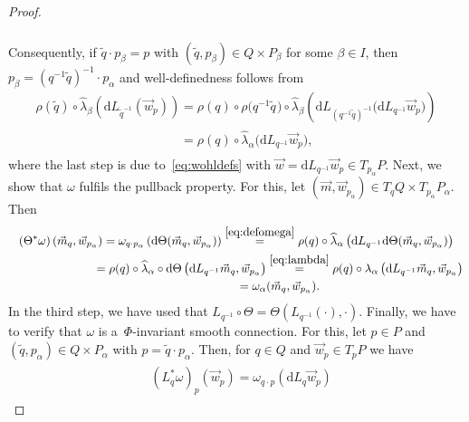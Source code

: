 \documentclass[11pt]{article}
\numberwithin{equation}{section}
\newcommand{\wt}[1]{\widetilde{#1}}
\begin{document}
\begin{proof}
\begin{gather}
\begin{split}
\end{split}
\label{eq:thirdstep}
\end{gather}
Consequently, if $\wt{q}\cdot p_\beta=p$ with $(\wt{q},p_\beta)\in Q\times P_\beta$ for some $\beta \in I$, then
$p_\beta=(q^{-1}\wt{q})^{-1}\cdot p_\alpha$ and well-def\/inedness follows from
\begin{gather*}
\rho(\wt{q})\circ \widehat{\lambda}_\beta\left(\mathrm{d}
L_{{\wt{q}}^{-1}}(\vec{w}_p)\right)=\rho(q)\circ\rho\big(q^{-1}\wt{q}\hspace{1pt}\big)\circ\widehat{\lambda}_\beta\left(\mathrm{d}
L_{(q^{-1}\wt{q})^{-1}}\big( \mathrm{d} L_{q^{-1}}\vec{w}_p\big)\right)
\\
\phantom{\rho(\wt{q})\circ \widehat{\lambda}_\beta\left(\mathrm{d}
L_{{\wt{q}}^{-1}}(\vec{w}_p)\right)}
{} =\rho(q)\circ \widehat{\lambda}_\alpha\big(\mathrm{d} L_{q^{-1}}\vec{w}_p\big),
\end{gather*}
where the last step is due to~\eqref{eq:wohldefs} with $\vec{w}=\mathrm{d} L_{q^{-1}}\vec{w}_p\in T_{p_\alpha}P$.
Next, we show that $\omega$ fulf\/ils the pullback property.
For this, let $(\vec{m},\vec{w}_{p_\alpha})\in T_qQ\times T_{p_\alpha}P_\alpha$.
Then
\begin{gather*}
(\Theta^{*}\omega)\left(\vec{m}_q,\vec{w}_{p_\alpha}\right)
=\omega_{q\cdot p_\alpha}\left(\mathrm{d}\Theta(\vec{m}_q,\vec{w}_{p_\alpha})\right) \stackrel{\eqref{eq:defomega}}{=}\rho(q)\circ
\widehat{\lambda}_\alpha\left(\mathrm{d} L_{q^{-1}}\mathrm{d}\Theta(\vec{m}_q,\vec{w}_{p_\alpha})\right)
\\
\phantom{(\Theta^{*}\omega)\left(\vec{m}_q,\vec{w}_{p_\alpha}\right)}
=\rho(q)\circ \widehat{\lambda}_\alpha\circ \mathrm{d}\Theta\left(\mathrm{d} L_{q^{-1}}
\vec{m}_q,\vec{w}_{p_\alpha}\right) \stackrel{\eqref{eq:lambda}}{=}\rho(q)\circ \lambda_\alpha\left(\mathrm{d}
L_{q^{-1}} \vec{m}_q,\vec{w}_{p_\alpha}\right)
\\
\phantom{(\Theta^{*}\omega)\left(\vec{m}_q,\vec{w}_{p_\alpha}\right)}
=\omega_\alpha(\vec{m}_q,\vec{w}_{p_\alpha}).
\end{gather*}
In the third step, we have used that $L_{q^{-1}}\circ \Theta= \Theta(L_{q^{-1}}(\cdot),\cdot)$.
Finally, we have to verify that $\omega$ is a~$\Phi$-invariant smooth connection.
For this, let $p\in P$ and $(\wt{q},p_\alpha)\in Q\times P_\alpha$ with $p=\wt{q}\cdot p_\alpha$.
Then, for $q\in Q$ and $\vec{w}_p\in T_pP$ we have
\begin{gather*}
\begin{split}
&\left(L_q^{*}\omega\right)_{p}(\vec{w}_{p})=\omega_{q\cdot p}\left(\mathrm{d} L_q \vec{w}_{p}\right)

\end{split}
\end{gather*}
\end{proof}
\end{document}
